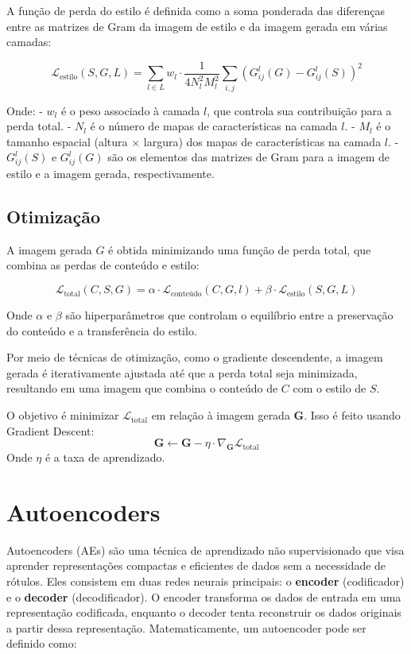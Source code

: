 \documentclass{tufte-handout}
\begin{document}
A função de perda do estilo é definida como a soma ponderada das diferenças entre as matrizes de Gram da imagem de estilo e da imagem gerada em várias camadas:

\begin{equation}
    \mathcal{L}_{\text{estilo}} (S, G, L) = \sum_{l \in L} w_l \cdot \frac{1}{4N_l^2 M_l^2} \sum_{i,j} \left(G^l_{ij}(G) - G^l_{ij}(S)\right)^2
\end{equation}

Onde:
- $w_l$ é o peso associado à camada $l$, que controla sua contribuição para a perda total.
- $N_l$ é o número de mapas de características na camada $l$.
- $M_l$ é o tamanho espacial (altura $\times$ largura) dos mapas de características na camada $l$.
- $G^l_{ij}(S)$ e $G^l_{ij}(G)$ são os elementos das matrizes de Gram para a imagem de estilo e a imagem gerada, respectivamente.

\subsection{Otimização}

A imagem gerada $G$ é obtida minimizando uma função de perda total, que combina as perdas de conteúdo e estilo:

\begin{equation}
    \mathcal{L}_{\text{total}} (C, S, G) = \alpha \cdot \mathcal{L}_{\text{conteúdo}} (C, G, l) + \beta \cdot \mathcal{L}_{\text{estilo}} (S, G, L)
\end{equation}

Onde $\alpha$ e $\beta$ são hiperparâmetros que controlam o equilíbrio entre a preservação do conteúdo e a transferência do estilo.

Por meio de técnicas de otimização, como o gradiente descendente, a imagem gerada é iterativamente ajustada até que a perda total seja minimizada, resultando em uma imagem que combina o conteúdo de $C$ com o estilo de $S$.


O objetivo é minimizar \( \mathcal{L}_{\text{total}} \) em relação à imagem gerada \( \mathbf{G} \). Isso é feito usando Gradient Descent:
\[
\mathbf{G} \leftarrow \mathbf{G} - \eta \cdot \nabla_{\mathbf{G}} \mathcal{L}_{\text{total}}
\]
Onde \( \eta \) é a taxa de aprendizado.

\section{Autoencoders}

Autoencoders (AEs) são uma técnica de aprendizado não supervisionado que visa aprender representações compactas e eficientes de dados sem a necessidade de rótulos. Eles consistem em duas redes neurais principais: o \textbf{encoder} (codificador) e o \textbf{decoder} (decodificador). O encoder transforma os dados de entrada em uma representação codificada, enquanto o decoder tenta reconstruir os dados originais a partir dessa representação. Matematicamente, um autoencoder pode ser definido como:
\end{document}
